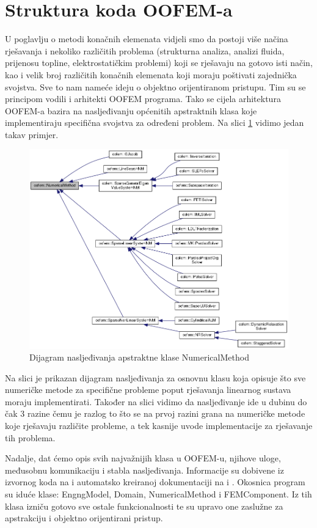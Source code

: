 \documentclass[a4paper,twoside,12pt]{memoir} %
\begin{document}
\section{Struktura koda OOFEM-a}
\label{poglavlje:struktura_koda}
U poglavlju o metodi konačnih elemenata vidjeli smo da postoji više načina rješavanja i nekoliko različitih problema (strukturna analiza, analizi fluida, prijenosu topline, elektrostatičkim problemi) koji se rješavaju na gotovo isti način, kao i velik broj različitih konačnih elemenata koji moraju poštivati zajednička svojstva. Sve to nam nameće ideju o objektno orijentiranom pristupu. Tim su se principom vodili i arhitekti OOFEM programa. Tako se cijela arhitektura OOFEM-a bazira na nasljeđivanju općenitih apstraktnih klasa koje implementiraju specifična svojstva za određeni problem. Na slici \ref{fig:numerical_method_inheritance} vidimo jedan takav primjer.
\begin{figure}[h!t]
\begin{center}
\includegraphics[scale=0.46]{pictures/chapter_oofem/NumericalMethod_inheritance.png}
\caption{Dijagram nasljeđivanja apstraktne klase NumericalMethod \cite{oofem_reference}}
\label{fig:numerical_method_inheritance}
\end{center}
\end{figure}
Na slici je prikazan dijagram nasljeđivanja za osnovnu klasu koja opisuje što sve numeričke metode za specifične probleme poput rješavanja linearnog sustava moraju implementirati. Također na slici vidimo da nasljeđivanje ide u dubinu do čak 3 razine čemu je razlog to što se na prvoj razini grana na numeričke metode koje rješavaju različite probleme, a tek kasnije uvode implementacije za rješavanje tih problema. \par
Nadalje, dat ćemo opis svih najvažnijih klasa u OOFEM-u, njihove uloge, međusobnu komunikaciju i stabla nasljeđivanja. Informacije su dobivene iz izvornog koda na \cite{oofem_github} i automatsko kreiranoj dokumentaciji  na \cite{oofem_reference} i \cite{oofem_programmer}. Okosnica program su iduće klase: EngngModel, Domain, NumericalMethod i FEMComponent. Iz tih klasa izniču gotovo sve ostale funkcionalnosti te su upravo one zaslužne za apstrakciju i objektno orijentirani pristup. \par
\end{document}
